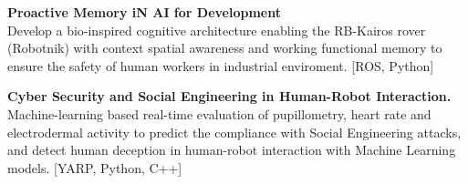 \documentclass[10pt,a4paper,ragged2e]{altacv}
\begin{document}

\begin{fullwidth}
\makecvheader
\end{fullwidth}



\textbf{Proactive Memory iN AI for Development}\\
Develop a bio-inspired cognitive architecture enabling the RB-Kairos rover (Robotnik) with context spatial awareness and working functional memory to ensure the safety of human workers in industrial enviroment. [ROS, Python]

\divider

\textbf{Cyber Security and Social Engineering in Human-Robot Interaction.}\\
Machine-learning based real-time evaluation of pupillometry, heart rate and electrodermal activity to predict the compliance with Social Engineering attacks, and detect human deception in human-robot interaction with Machine Learning models. [YARP, Python, C++]
\end{document}
